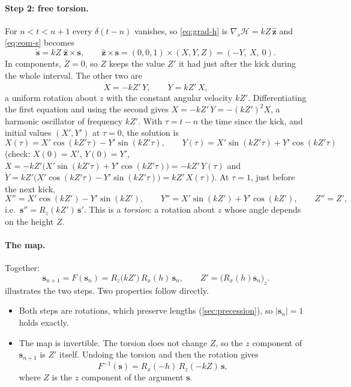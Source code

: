 \documentclass[11pt,a4paper]{article}
\newcommand{\vs}{\bm{s}}
\begin{document}
\paragraph{Step 2: free torsion.} For $n < t < n+1$ every $\delta(t-n)$ vanishes, so \eqref{eq:grad-h} is
$\nabla_{\!s} \mathcal H = kZ\,\hat{\bm z}$ and \eqref{eq:eom-s} becomes
\begin{equation}\label{eq:torsion-ode}
  \dot{\vs} = kZ\;\hat{\bm z}\times\vs, \qquad \hat{\bm z}\times\vs = (0,0,1)\times(X,Y,Z) = (-Y,\ X,\ 0).
\end{equation}
In components, $\dot Z = 0$, so $Z$ keeps the value $Z'$ it had just after the kick during the whole interval. The
other two are
\begin{equation*}
  \dot X = -kZ'\,Y, \qquad \dot Y = kZ'\,X ,
\end{equation*}
a uniform rotation about $z$ with the constant angular velocity $kZ'$. Differentiating the first equation and using
the second gives $\ddot X = -kZ'\,\dot Y = -(kZ')^2X$, a harmonic oscillator of frequency $kZ'$. With $\tau = t - n$
the time since the kick, and initial values $(X', Y')$ at $\tau = 0$, the solution is
\begin{equation*}
  X(\tau) = X'\cos(kZ'\tau) - Y'\sin(kZ'\tau), \qquad Y(\tau) = X'\sin(kZ'\tau) + Y'\cos(kZ'\tau)
\end{equation*}
(check: $X(0) = X'$, $Y(0) = Y'$, $\dot X = -kZ'\big(X'\sin(kZ'\tau) + Y'\cos(kZ'\tau)\big) = -kZ'\,Y(\tau)$ and
$\dot Y = kZ'\big(X'\cos(kZ'\tau) - Y'\sin(kZ'\tau)\big) = kZ'\,X(\tau)$). At $\tau = 1$, just before the next kick,
\begin{equation}\label{eq:torsion}
  X'' = X'\cos(kZ') - Y'\sin(kZ'), \qquad Y'' = X'\sin(kZ') + Y'\cos(kZ'), \qquad Z'' = Z' ,
\end{equation}
i.e.\ $\vs'' = R_z(kZ')\,\vs'$. This is a \emph{torsion}: a rotation about $z$ whose angle depends on the height $Z$.

\paragraph{The map.} Together:
\begin{equation}\label{eq:map}
  \boxed{\vs_{n+1} = F(\vs_n) = R_z\!\big(k Z'\big)\, R_x(h)\, \vs_n , \qquad Z' = \big(R_x(h)\vs_n\big)_z .}
\end{equation}
 illustrates the two steps. Two properties follow directly.
\begin{itemize}
  \item Both steps are rotations, which preserve lengths (\cref{sec:precession}), so $|\vs_n| = 1$ holds exactly.
  \item The map is invertible. The torsion does not change $Z$, so the $z$ component of $\vs_{n+1}$ is $Z'$
  itself. Undoing the torsion and then the rotation gives
  \begin{equation*}
    F^{-1}(\vs) = R_x(-h)\,R_z(-kZ)\,\vs ,
  \end{equation*}
  where $Z$ is the $z$ component of the argument $\vs$.
\end{itemize}
\end{document}
